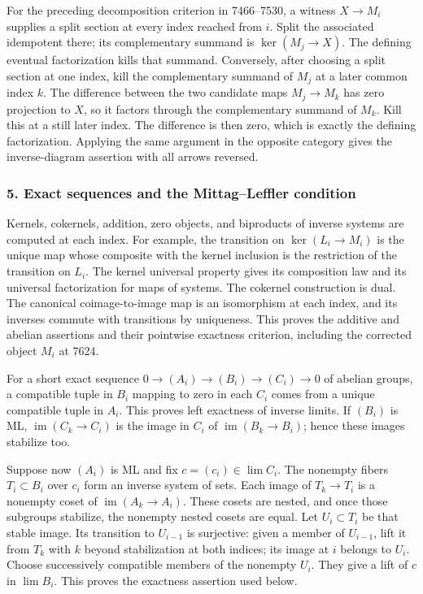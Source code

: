 \documentclass[11pt]{article}
\begin{document}
For the preceding decomposition criterion in 7466--7530, a witness \(X\to M_i\) supplies a split section at every index reached from \(i\). Split the associated idempotent there; its complementary summand is \(\ker(M_j\to X)\). The defining eventual factorization kills that summand. Conversely, after choosing a split section at one index, kill the complementary summand of \(M_j\) at a later common index \(k\). The difference between the two candidate maps \(M_j\to M_k\) has zero projection to \(X\), so it factors through the complementary summand of \(M_k\). Kill this at a still later index. The difference is then zero, which is exactly the defining factorization. Applying the same argument in the opposite category gives the inverse-diagram assertion with all arrows reversed.

\subsubsection{5. Exact sequences and the Mittag--Leffler condition}\label{exact-sequences-and-the-mittagleffler-condition}

Kernels, cokernels, addition, zero objects, and biproducts of inverse systems are computed at each index. For example, the transition on \(\ker(L_i\to M_i)\) is the unique map whose composite with the kernel inclusion is the restriction of the transition on \(L_i\). The kernel universal property gives its composition law and its universal factorization for maps of systems. The cokernel construction is dual. The canonical coimage-to-image map is an isomorphism at each index, and its inverses commute with transitions by uniqueness. This proves the additive and abelian assertions and their pointwise exactness criterion, including the corrected object \(M_i\) at 7624.

For a short exact sequence \(0\to(A_i)\to(B_i)\to(C_i)\to0\) of abelian groups, a compatible tuple in \(B_i\) mapping to zero in each \(C_i\) comes from a unique compatible tuple in \(A_i\). This proves left exactness of inverse limits. If \((B_i)\) is ML, \(\operatorname{im}(C_k\to C_i)\) is the image in \(C_i\) of \(\operatorname{im}(B_k\to B_i)\); hence these images stabilize too.

Suppose now \((A_i)\) is ML and fix \(c=(c_i)\in\lim C_i\). The nonempty fibers \(T_i\subset B_i\) over \(c_i\) form an inverse system of sets. Each image of \(T_k\to T_i\) is a nonempty coset of \(\operatorname{im}(A_k\to A_i)\). These cosets are nested, and once those subgroups stabilize, the nonempty nested cosets are equal. Let \(U_i\subset T_i\) be that stable image. Its transition to \(U_{i-1}\) is surjective: given a member of \(U_{i-1}\), lift it from \(T_k\) with \(k\) beyond stabilization at both indices; its image at \(i\) belongs to \(U_i\). Choose successively compatible members of the nonempty \(U_i\). They give a lift of \(c\) in \(\lim B_i\). This proves the exactness assertion used below.
\end{document}
